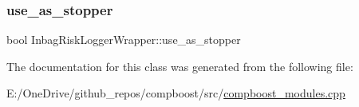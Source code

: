 \mbox{\label{class_inbag_risk_logger_wrapper_aca25b80855d0f8dcf9b59a4d544ecca8}} 
\subsubsection{\texorpdfstring{use\+\_\+as\+\_\+stopper}{use\_as\_stopper}}
{\footnotesize\ttfamily bool Inbag\+Risk\+Logger\+Wrapper\+::use\+\_\+as\+\_\+stopper\hspace{0.3cm}{\ttfamily [private]}}



The documentation for this class was generated from the following file\+:\begin{DoxyCompactItemize}
\item 
E\+:/\+One\+Drive/github\+\_\+repos/compboost/src/\mbox{\hyperlink{compboost__modules_8cpp}{compboost\+\_\+modules.\+cpp}}\end{DoxyCompactItemize}
